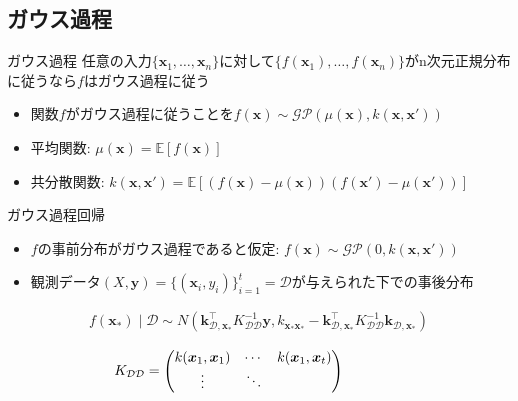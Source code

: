\documentclass[dvipdfmx, 10.5pt]{beamer}
\begin{document}

\subsection{ガウス過程}
\begin{frame}{\insertsubsection}
	\begin{block}{ガウス過程}
		任意の入力$\{ \bm x_1, \ldots, \bm x_n \}$に対して$\{f(\bm x_1), \ldots, f(\bm x_n)\}$がn次元正規分布に従うなら$f$はガウス過程に従う
	\end{block}

\begin{itemize}
	\item 関数$f$がガウス過程に従うことを$f(\bm x) \sim \mathcal{GP}(\mu(\bm x), k(\bm x, \bm x'))$
	\item 平均関数: $\mu(\bm x) = \mathbb{E}[f(\bm x)]$
	\item 共分散関数: $k(\bm x, \bm x') = \mathbb{E}[(f(\bm x) - \mu(\bm x))(f(\bm x') - \mu(\bm x'))]$
\end{itemize}
\begin{block}{ガウス過程回帰}
	\begin{itemize}
		\item $f$の事前分布がガウス過程であると仮定: $f(\bm x) \sim \mathcal{GP}( 0, k(\bm x, \bm x'))$
		\item 観測データ$(X, \bm y) = \{(\bm x_i, y_i)\}_{i = 1}^t = \mathcal{D}$が与えられた下での事後分布
	\end{itemize}
	\begin{footnotesize}	
	\begin{align*}
		f({\bm x}_\ast) \mid \mathcal{D}
			\sim
			N \left(
			\bm k_{\mathcal{D}, {\bm x}_\ast   }^\top
			K_{\mathcal{D} \mathcal{D}}^{-1}
			{\bm y},%
			k_{{\bm x}_\ast {\bm x}_\ast}
			-
			\bm k_{\mathcal{D} , {\bm x}_\ast}^\top
			K_{\mathcal{D} \mathcal{D}}^{-1}
			\bm k_{\mathcal{D} , {\bm x}_\ast}%
			\right)
	\end{align*}
	\end{footnotesize}
	\begin{tiny}
		\begin{align*}
			\hspace*{-15mm}
			K_{\mathcal{D} \mathcal{D}}
			=
			\begin{pmatrix}
				k(\bm x_{ 1}, \bm x_{ 1}) &
				\cdots &
				k(\bm x_{ 1}, \bm x_{ t}) \\
				\vdots &
				\ddots &

\end{pmatrix}
\end{align*}
\end{tiny}
\end{block}
\end{frame}
\end{document}
